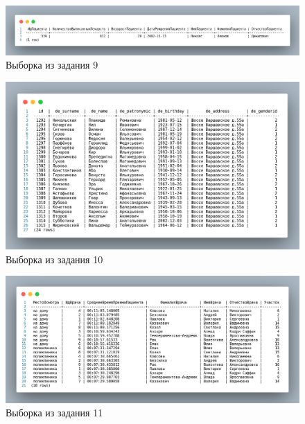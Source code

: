 \begin{figure}[p!h]
  \centering

  \includegraphics[width=16cm]
  {../sql/select/9-out.png}

  \caption{Выборка из задания 9}

  \label{fig:t9}
\end{figure}

\begin{figure}[p!h]
  \centering

  \includegraphics[width=16cm]
  {../sql/select/10-out.png}

  \caption{Выборка из задания 10}

  \label{fig:t10}
\end{figure}

\begin{figure}[p!h]
  \centering

  \includegraphics[width=16cm]
  {../sql/select/11-out.png}

  \caption{Выборка из задания 11}

  \label{fig:t11}
\end{figure}
